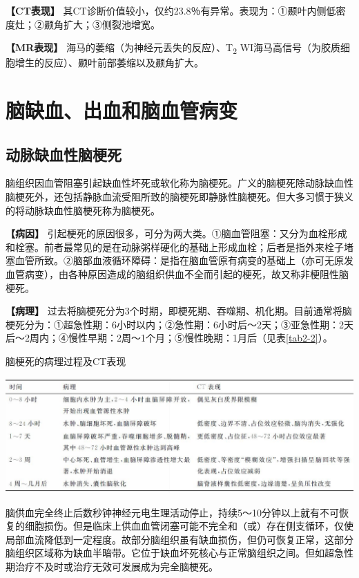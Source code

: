 \textbf{【CT表现】}
其CT诊断价值较小，仅约23.8％有异常。表现为：①颞叶内侧低密度灶；②颞角扩大；③侧裂池增宽。

\textbf{【MR表现】} 海马的萎缩（为神经元丢失的反应）、T\textsubscript{2}
WI海马高信号（为胶质细胞增生的反应）、颞叶前部萎缩以及颞角扩大。

\section{脑缺血、出血和脑血管病变}

\subsection{动脉缺血性脑梗死}

脑组织因血管阻塞引起缺血性坏死或软化称为脑梗死。广义的脑梗死除动脉缺血性脑梗死外，还包括静脉血流受阻所致的脑梗死即静脉性脑梗死。但大多习惯于狭义的将动脉缺血性脑梗死称为脑梗死。

\textbf{【病因】}
引起梗死的原因很多，可分为两大类。①脑血管阻塞：又分为血栓形成和栓塞。前者最常见的是在动脉粥样硬化的基础上形成血栓；后者是指外来栓子堵塞血管所致。②脑部血液循环障碍：是指在脑血管原有病变的基础上（亦可无原发血管病变），由各种原因造成的脑组织供血不全而引起的梗死，故又称非梗阻性脑梗死。

\textbf{【病理】}
过去将脑梗死分为3个时期，即梗死期、吞噬期、机化期。目前通常将脑梗死分为：①超急性期：6小时以内；②急性期：6小时后～2天；③亚急性期：2天后～2周内；④慢性早期：2周～1个月；⑤慢性晚期：1月后（见表\ref{tab2-2}）。

\begin{table}[htbp]
\centering
\caption{脑梗死的病理过程及CT表现}
\label{tab2-2}
\includegraphics[width=\textwidth,height=\textheight,keepaspectratio]{./images/Image00037.jpg}
\end{table}

脑供血完全终止后数秒钟神经元电生理活动停止，持续5～10分钟以上就有不可恢复的细胞损伤。但是临床上供血血管闭塞可能不完全和（或）存在侧支循环，仅使局部血流降低到一定程度。故部分脑组织虽有缺血损伤，但仍可恢复正常，这部分脑组织区域称为缺血半暗带。它位于缺血坏死核心与正常脑组织之间。但如超急性期治疗不及时或治疗无效可发展成为完全脑梗死。

